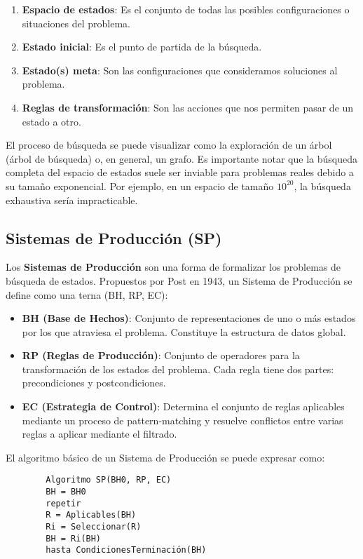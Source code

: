 \documentclass[12pt,a4paper]{report}
\begin{document}
	\begin{enumerate}
		\item \textbf{Espacio de estados}: Es el conjunto de todas las posibles configuraciones o situaciones del problema.
		\item \textbf{Estado inicial}: Es el punto de partida de la búsqueda.
		\item \textbf{Estado(s) meta}: Son las configuraciones que consideramos soluciones al problema.
		\item \textbf{Reglas de transformación}: Son las acciones que nos permiten pasar de un estado a otro.
	\end{enumerate}
	
	El proceso de búsqueda se puede visualizar como la exploración de un árbol (árbol de búsqueda) o, en general, un grafo. Es importante notar que la búsqueda completa del espacio de estados suele ser inviable para problemas reales debido a su tamaño exponencial. Por ejemplo, en un espacio de tamaño $10^{20}$, la búsqueda exhaustiva sería impracticable.
	
	\subsection{Sistemas de Producción (SP)}
	
	Los \textbf{Sistemas de Producción} son una forma de formalizar los problemas de búsqueda de estados. Propuestos por Post en 1943, un Sistema de Producción se define como una terna (BH, RP, EC):
	
	\begin{itemize}
		\item \textbf{BH (Base de Hechos)}: Conjunto de representaciones de uno o más estados por los que atraviesa el problema. Constituye la estructura de datos global.
		\item \textbf{RP (Reglas de Producción)}: Conjunto de operadores para la transformación de los estados del problema. Cada regla tiene dos partes: precondiciones y postcondiciones.
		\item \textbf{EC (Estrategia de Control)}: Determina el conjunto de reglas aplicables mediante un proceso de pattern-matching y resuelve conflictos entre varias reglas a aplicar mediante el filtrado.
	\end{itemize}
	
	El algoritmo básico de un Sistema de Producción se puede expresar como:
	
	\begin{verbatim}
		Algoritmo SP(BH0, RP, EC)
		BH = BH0
		repetir
		R = Aplicables(BH)
		Ri = Seleccionar(R)
		BH = Ri(BH)
		hasta CondicionesTerminación(BH)
	\end{verbatim}
	
\end{document}
